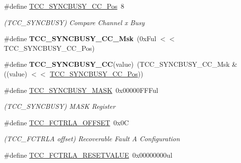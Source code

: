 \begin{DoxyCompactItemize}
\item 
\hypertarget{group___s_a_m_l21___t_c_c_ga6add317838e5b3eaba4d07fb3a1ce62a}{}\#define \hyperlink{group___s_a_m_l21___t_c_c_ga6add317838e5b3eaba4d07fb3a1ce62a}{T\+C\+C\+\_\+\+S\+Y\+N\+C\+B\+U\+S\+Y\+\_\+\+C\+C\+\_\+\+Pos}~8\label{group___s_a_m_l21___t_c_c_ga6add317838e5b3eaba4d07fb3a1ce62a}

\begin{DoxyCompactList}\small\item\em (T\+C\+C\+\_\+\+S\+Y\+N\+C\+B\+U\+S\+Y) Compare Channel x Busy \end{DoxyCompactList}\item 
\hypertarget{group___s_a_m_l21___t_c_c_gac3be77a497864f1585b7d17c84d76a89}{}\#define {\bfseries T\+C\+C\+\_\+\+S\+Y\+N\+C\+B\+U\+S\+Y\+\_\+\+C\+C\+\_\+\+Msk}~(0x\+Ful $<$$<$ T\+C\+C\+\_\+\+S\+Y\+N\+C\+B\+U\+S\+Y\+\_\+\+C\+C\+\_\+\+Pos)\label{group___s_a_m_l21___t_c_c_gac3be77a497864f1585b7d17c84d76a89}

\item 
\hypertarget{group___s_a_m_l21___t_c_c_ga7028d00d0084d14f6014b62ff47d4a16}{}\#define {\bfseries T\+C\+C\+\_\+\+S\+Y\+N\+C\+B\+U\+S\+Y\+\_\+\+C\+C}(value)~(T\+C\+C\+\_\+\+S\+Y\+N\+C\+B\+U\+S\+Y\+\_\+\+C\+C\+\_\+\+Msk \& ((value) $<$$<$ \hyperlink{group___s_a_m_l21___t_c_c_ga6add317838e5b3eaba4d07fb3a1ce62a}{T\+C\+C\+\_\+\+S\+Y\+N\+C\+B\+U\+S\+Y\+\_\+\+C\+C\+\_\+\+Pos}))\label{group___s_a_m_l21___t_c_c_ga7028d00d0084d14f6014b62ff47d4a16}

\item 
\hypertarget{group___s_a_m_l21___t_c_c_ga9404a4f78cbe1eff65e2f28a572db8ad}{}\#define \hyperlink{group___s_a_m_l21___t_c_c_ga9404a4f78cbe1eff65e2f28a572db8ad}{T\+C\+C\+\_\+\+S\+Y\+N\+C\+B\+U\+S\+Y\+\_\+\+M\+A\+S\+K}~0x00000\+F\+F\+Ful\label{group___s_a_m_l21___t_c_c_ga9404a4f78cbe1eff65e2f28a572db8ad}

\begin{DoxyCompactList}\small\item\em (T\+C\+C\+\_\+\+S\+Y\+N\+C\+B\+U\+S\+Y) M\+A\+S\+K Register \end{DoxyCompactList}\item 
\hypertarget{group___s_a_m_l21___t_c_c_ga98f32775ff37024693543237f3f61ff4}{}\#define \hyperlink{group___s_a_m_l21___t_c_c_ga98f32775ff37024693543237f3f61ff4}{T\+C\+C\+\_\+\+F\+C\+T\+R\+L\+A\+\_\+\+O\+F\+F\+S\+E\+T}~0x0\+C\label{group___s_a_m_l21___t_c_c_ga98f32775ff37024693543237f3f61ff4}

\begin{DoxyCompactList}\small\item\em (T\+C\+C\+\_\+\+F\+C\+T\+R\+L\+A offset) Recoverable Fault A Configuration \end{DoxyCompactList}\item 
\hypertarget{group___s_a_m_l21___t_c_c_gaabe5975bae91f05e98b0523f572268e4}{}\#define \hyperlink{group___s_a_m_l21___t_c_c_gaabe5975bae91f05e98b0523f572268e4}{T\+C\+C\+\_\+\+F\+C\+T\+R\+L\+A\+\_\+\+R\+E\+S\+E\+T\+V\+A\+L\+U\+E}~0x00000000ul\label{group___s_a_m_l21___t_c_c_gaabe5975bae91f05e98b0523f572268e4}


\end{DoxyCompactItemize}
